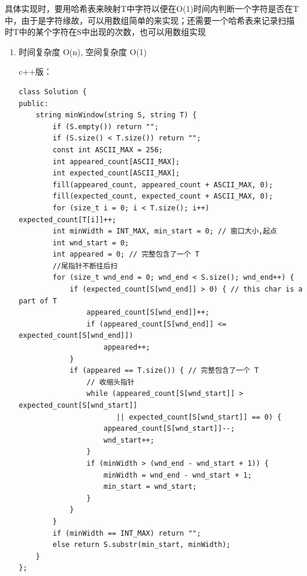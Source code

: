 \documentclass[12pt]{book}
\begin{document}
具体实现时，要用哈希表来映射T中字符以便在O(1)时间内判断一个字符是否在T
中，由于是字符缘故，可以用数组简单的来实现；还需要一个哈希表来记录扫描
时T中的某个字符在S中出现的次数，也可以用数组实现

\begin{enumerate}
\item 时间复杂度 O(n), 空间复杂度 O(1)
\label{sec-15-3-4-1}

c++版：
\lstset{language=java,label= ,caption= ,numbers=none}
\begin{lstlisting}
class Solution {
public:
    string minWindow(string S, string T) {
        if (S.empty()) return "";
        if (S.size() < T.size()) return "";
        const int ASCII_MAX = 256;
        int appeared_count[ASCII_MAX];
        int expected_count[ASCII_MAX];
        fill(appeared_count, appeared_count + ASCII_MAX, 0);
        fill(expected_count, expected_count + ASCII_MAX, 0);
        for (size_t i = 0; i < T.size(); i++) expected_count[T[i]]++;
        int minWidth = INT_MAX, min_start = 0; // 窗口大小,起点
        int wnd_start = 0;
        int appeared = 0; // 完整包含了一个 T
        //尾指针不断往后扫
        for (size_t wnd_end = 0; wnd_end < S.size(); wnd_end++) {
            if (expected_count[S[wnd_end]] > 0) { // this char is a part of T
                appeared_count[S[wnd_end]]++;
                if (appeared_count[S[wnd_end]] <= expected_count[S[wnd_end]])
                    appeared++;
            }
            if (appeared == T.size()) { // 完整包含了一个 T
                // 收缩头指针
                while (appeared_count[S[wnd_start]] > expected_count[S[wnd_start]]
                       || expected_count[S[wnd_start]] == 0) {
                    appeared_count[S[wnd_start]]--;
                    wnd_start++;
                }
                if (minWidth > (wnd_end - wnd_start + 1)) {
                    minWidth = wnd_end - wnd_start + 1;
                    min_start = wnd_start;
                }
            }
        }
        if (minWidth == INT_MAX) return "";
        else return S.substr(min_start, minWidth);
    }
};
\end{lstlisting}


\end{enumerate}
\end{document}
